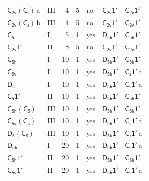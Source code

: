 \documentclass[10pt,a4paper]{article}
\numberwithin{equation}{section}
\newcommand{\grp}[1]{\mathsf{#1}}
\newcommand{\clsletter}[1]{\,{\scriptsize\color{black!55}#1}}
\begin{document}
{\begin{longtable}{@{}llrrlll@{}}
\href{C2v-C1v.pdf}{$\grp{C_{2v}}(\grp{C_{s}})$}\clsletter{a} & III & 4 & 5 & no & \href{C2v-1p.pdf}{$\grp{C_{2v}1'}$} & \href{C2v-1p.pdf}{$\grp{C_{2v}1'}$}\\
\href{C2v-C1v.pdf}{$\grp{C_{2v}}(\grp{C_{s}})$}\clsletter{b} & III & 4 & 5 & no & \href{C2v-1p.pdf}{$\grp{C_{2v}1'}$} & \href{C2v-1p.pdf}{$\grp{C_{2v}1'}$}\\
\href{../../../rotation/data/pdf/C5.pdf}{$\grp{C_{5}}$} & I & 5 & 1 & yes & \href{D5h-1p.pdf}{$\grp{D_{5h}1'}$} & \href{C5h-1p.pdf}{$\grp{C_{5h}1'}$}\\
\href{C2v-1p.pdf}{$\grp{C_{2v}1'}$} & II & 8 & 5 & no & \href{C2v-1p.pdf}{$\grp{C_{2v}1'}$} & \href{C2v-1p.pdf}{$\grp{C_{2v}1'}$}\\
\href{../../../rotation/data/pdf/C5h.pdf}{$\grp{C_{5h}}$} & I & 10 & 1 & yes & \href{D5h-1p.pdf}{$\grp{D_{5h}1'}$} & \href{C5h-1p.pdf}{$\grp{C_{5h}1'}$}\\
\href{../../../rotation/data/pdf/C5v.pdf}{$\grp{C_{5v}}$} & I & 10 & 1 & yes & \href{D5h-1p.pdf}{$\grp{D_{5h}1'}$} & \href{C1v-1p.pdf}{$\grp{C_{s}1'}$}\clsletter{a}\\
\href{../../../rotation/data/pdf/D5.pdf}{$\grp{D_{5}}$} & I & 10 & 1 & yes & \href{D5h-1p.pdf}{$\grp{D_{5h}1'}$} & \href{C1v-1p.pdf}{$\grp{C_{s}1'}$}\clsletter{a}\\
\href{C5-1p.pdf}{$\grp{C_{5}1'}$} & II & 10 & 1 & yes & \href{D5h-1p.pdf}{$\grp{D_{5h}1'}$} & \href{C5h-1p.pdf}{$\grp{C_{5h}1'}$}\\
\href{C5h-C5.pdf}{$\grp{C_{5h}}(\grp{C_{5}})$} & III & 10 & 1 & yes & \href{D5h-1p.pdf}{$\grp{D_{5h}1'}$} & \href{C5h-1p.pdf}{$\grp{C_{5h}1'}$}\\
\href{C5v-C5.pdf}{$\grp{C_{5v}}(\grp{C_{5}})$} & III & 10 & 1 & yes & \href{D5h-1p.pdf}{$\grp{D_{5h}1'}$} & \href{C1v-1p.pdf}{$\grp{C_{s}1'}$}\clsletter{a}\\
\href{D5-C5.pdf}{$\grp{D_{5}}(\grp{C_{5}})$} & III & 10 & 1 & yes & \href{D5h-1p.pdf}{$\grp{D_{5h}1'}$} & \href{C1v-1p.pdf}{$\grp{C_{s}1'}$}\clsletter{a}\\
\href{../../../rotation/data/pdf/D5h.pdf}{$\grp{D_{5h}}$} & I & 20 & 1 & yes & \href{D5h-1p.pdf}{$\grp{D_{5h}1'}$} & \href{C1v-1p.pdf}{$\grp{C_{s}1'}$}\clsletter{a}\\
\href{C5h-1p.pdf}{$\grp{C_{5h}1'}$} & II & 20 & 1 & yes & \href{D5h-1p.pdf}{$\grp{D_{5h}1'}$} & \href{C5h-1p.pdf}{$\grp{C_{5h}1'}$}\\
\href{C5v-1p.pdf}{$\grp{C_{5v}1'}$} & II & 20 & 1 & yes & \href{D5h-1p.pdf}{$\grp{D_{5h}1'}$} & \href{C1v-1p.pdf}{$\grp{C_{s}1'}$}\clsletter{a}\\

\end{longtable}}
\end{document}
